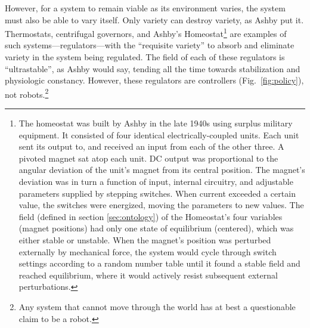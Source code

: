 However, for a system to remain viable as its environment varies, the system must also be able to vary itself.
Only variety can destroy variety, as Ashby put it.
Thermostats, centrifugal governors, and Ashby's Homeostat\footnote{%
The homeostat was built by Ashby in the late 1940s using surplus military equipment.
It consisted of four identical electrically-coupled units.
Each unit sent its output to, and received an input from each of the other three.
A pivoted magnet sat atop each unit.
DC output was proportional to the angular deviation of the unit's magnet from its central position.
The magnet's deviation was in turn a function of input, internal circuitry, and 
adjustable parameters supplied by stepping switches.
When current exceeded a certain value, the switches were energized, moving the parameters to new values.
The field (defined in section \ref{sec:ontology}) of the Homeostat's four variables (magnet positions) had only one state of equilibrium (centered), which was either stable or unstable.
When the magnet's position was perturbed externally by mechanical force, the system would cycle through switch settings according to a random number table until it found a stable field and reached equilibrium, where it would actively resist subsequent external perturbations.
}
are examples of such systems---regulators---with the ``requisite variety'' to
absorb and eliminate
variety in the system being regulated.
The field of each of these regulators is ``ultrastable'', as Ashby would say, tending all the time towards stabilization and
physiologic constancy.
However, these regulators are controllers (Fig.~\ref{fig:policy}), not robots.\footnote{Any system that cannot move through the world has at best a questionable claim to be a robot.}


